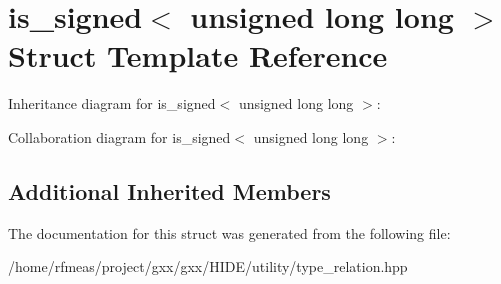\hypertarget{structis__signed_3_01unsigned_01long_01long_01_4}{}\section{is\+\_\+signed$<$ unsigned long long $>$ Struct Template Reference}
\label{structis__signed_3_01unsigned_01long_01long_01_4}


Inheritance diagram for is\+\_\+signed$<$ unsigned long long $>$\+:


Collaboration diagram for is\+\_\+signed$<$ unsigned long long $>$\+:
\subsection*{Additional Inherited Members}


The documentation for this struct was generated from the following file\+:\begin{DoxyCompactItemize}
\item 
/home/rfmeas/project/gxx/gxx/\+H\+I\+D\+E/utility/type\+\_\+relation.\+hpp\end{DoxyCompactItemize}
